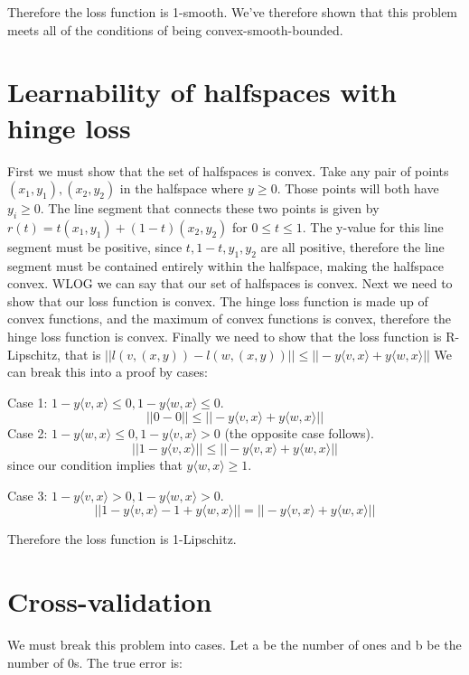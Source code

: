 \documentclass{article}
\begin{document}
Therefore the loss function is 1-smooth. We've therefore shown that this problem meets all of the conditions of being convex-smooth-bounded.

\section{Learnability of halfspaces with hinge loss}
First we must show that the set of halfspaces is convex. Take any pair of points\( (x_1,y_1),(x_2,y_2) \) in the halfspace where \(y \ge 0 \). Those points will both have \(y_i \ge 0\).
The line segment that connects these two points is given by \( r(t) = t(x_1,y_1) + (1-t)(x_2,y_2) \) for \(0 \le t \le 1 \). The y-value for this line segment must be positive, since \(t,1-t, y_1, y_2 \) are all positive,
therefore the line segment must be contained entirely within the halfspace, making the halfspace convex. WLOG we can say that our set of halfspaces is convex.
Next we need to show that our loss function is convex. The hinge loss function is made up of convex functions, and the maximum of convex functions is convex, therefore the hinge loss function is convex.
Finally we need to show that the loss function is R-Lipschitz, that is \( || l(v,(x,y)) - l(w,(x,y)) || \le || - y \langle v,x \rangle + y \langle w,x \rangle || \)
We can break this into a proof by cases:

Case 1: \( 1- y \langle v,x \rangle \le 0 , 1- y \langle w,x \rangle \le 0 \).
\begin{equation}
|| 0 - 0 || \le || - y \langle v,x \rangle + y \langle w,x \rangle ||
\end{equation}
Case 2: \( 1- y \langle w,x \rangle \le 0 , 1- y \langle v,x \rangle > 0 \) (the opposite case follows).
\begin{equation}
|| 1- y \langle v,x \rangle || \le || - y \langle v,x \rangle + y \langle w,x \rangle ||
\end{equation}
since our condition implies that \(y \langle w,x \rangle \ge 1\).

Case 3: \( 1- y \langle v,x \rangle > 0 , 1- y \langle w,x \rangle > 0 \).
\begin{equation}
|| 1- y \langle v,x \rangle - 1+ y \langle w,x \rangle|| = || - y \langle v,x \rangle + y \langle w,x \rangle ||
\end{equation}

Therefore the loss function is 1-Lipschitz.

\section{Cross-validation}
We must break this problem into cases. Let a be the number of ones and b be the number of 0s. The true error is:
\end{document}
